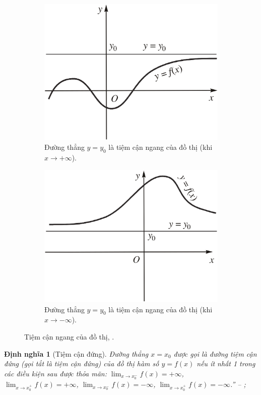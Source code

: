 \documentclass{article}
\numberwithin{equation}{section}
\newtheorem{dinhnghia}{Định nghĩa}[section]
\begin{document}
\begin{figure}[h]
	\centering
	\begin{subfigure}{.5\textwidth}
		\centering
		\includegraphics[width=.5\linewidth]{tiem_can_ngang_a}
		\caption{Đường thẳng $y = y_0$ là tiệm cận ngang của đồ thị (khi $x\to+\infty$).}
	\end{subfigure}%
	\begin{subfigure}{.5\textwidth}
		\centering
		\includegraphics[width=.5\linewidth]{tiem_can_ngang_b}
		\caption{Đường thẳng $y = y_0$ là tiệm cận ngang của đồ thị (khi $x\to-\infty$).}
	\end{subfigure}
	\caption{Tiệm cận ngang của đồ thị, \cite[Hình 1.7, p. 29]{SGK_Toan_12_giai_tich_nang_cao}.}
	\label{fig:tiem_can_ngang}
\end{figure}

\begin{dinhnghia}[Tiệm cận đứng]
	Đường thẳng $x = x_0$ được gọi là \emph{đường tiệm cận đứng} (gọi tắt là \emph{tiệm cận đứng}) của đồ thị hàm số $y = f(x)$ nếu ít nhất 1 trong các điều kiện sau được thỏa mãn: $\lim_{x\to x_0^-} f(x) = +\infty$, $\lim_{x\to x_0^+} f(x) = +\infty$, $\lim_{x\to x_0^-} f(x) = -\infty$, $\lim_{x\to x_0^+} f(x) = -\infty$.'' -- \cite[pp. 28--30]{SGK_Toan_12_giai_tich_nang_cao}; \cite[p. 10--11]{TL_chuyen_Toan_Giai_Tich_12}
\end{dinhnghia}
\end{document}
